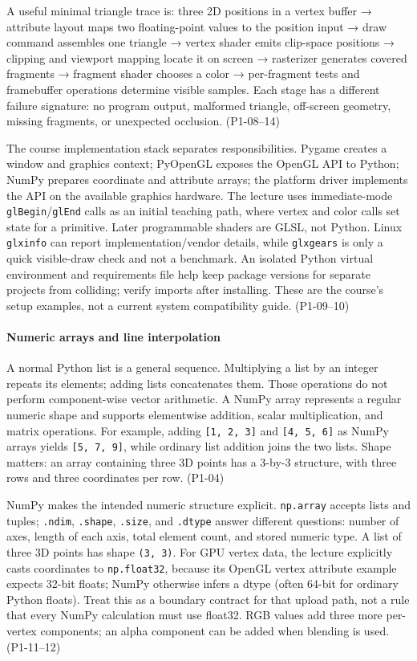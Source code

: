 A useful minimal triangle trace is: three 2D positions in a vertex buffer → attribute layout maps two floating-point values to the position input → draw command assembles one triangle → vertex shader emits clip-space positions → clipping and viewport mapping locate it on screen → rasterizer generates covered fragments → fragment shader chooses a color → per-fragment tests and framebuffer operations determine visible samples. Each stage has a different failure signature: no program output, malformed triangle, off-screen geometry, missing fragments, or unexpected occlusion. (P1-08--14)

The course implementation stack separates responsibilities. Pygame creates a window and graphics context; PyOpenGL exposes the OpenGL API to Python; NumPy prepares coordinate and attribute arrays; the platform driver implements the API on the available graphics hardware. The lecture uses immediate-mode \texttt{glBegin}/\texttt{glEnd} calls as an initial teaching path, where vertex and color calls set state for a primitive. Later programmable shaders are GLSL, not Python. Linux \texttt{glxinfo} can report implementation/vendor details, while \texttt{glxgears} is only a quick visible-draw check and not a benchmark. An isolated Python virtual environment and requirements file help keep package versions for separate projects from colliding; verify imports after installing. These are the course's setup examples, not a current system compatibility guide. (P1-09--10)

\paragraph{Numeric arrays and line interpolation}\label{numeric-arrays-and-line-interpolation}

A normal Python list is a general sequence. Multiplying a list by an integer repeats its elements; adding lists concatenates them. Those operations do not perform component-wise vector arithmetic. A NumPy array represents a regular numeric shape and supports elementwise addition, scalar multiplication, and matrix operations. For example, adding \texttt{{[}1,\ 2,\ 3{]}} and \texttt{{[}4,\ 5,\ 6{]}} as NumPy arrays yields \texttt{{[}5,\ 7,\ 9{]}}, while ordinary list addition joins the two lists. Shape matters: an array containing three 3D points has a 3-by-3 structure, with three rows and three coordinates per row. (P1-04)

NumPy makes the intended numeric structure explicit. \texttt{np.array} accepts lists and tuples; \texttt{.ndim}, \texttt{.shape}, \texttt{.size}, and \texttt{.dtype} answer different questions: number of axes, length of each axis, total element count, and stored numeric type. A list of three 3D points has shape \texttt{(3,\ 3)}. For GPU vertex data, the lecture explicitly casts coordinates to \texttt{np.float32}, because its OpenGL vertex attribute example expects 32-bit floats; NumPy otherwise infers a dtype (often 64-bit for ordinary Python floats). Treat this as a boundary contract for that upload path, not a rule that every NumPy calculation must use float32. RGB values add three more per-vertex components; an alpha component can be added when blending is used. (P1-11--12)

